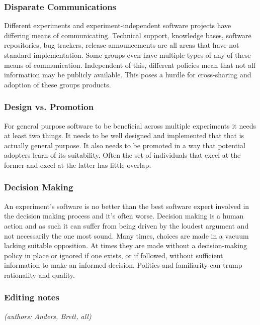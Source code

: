 \subsubsection{Disparate Communications}

Different experiments and experiment-independent software projects
have differing means of communicating.  Technical support, knowledge
bases, software repositories, bug trackers, release announcements are
all areas that have not standard implementation.  Some groups even
have multiple types of any of these means of communication.
Independent of this, different policies mean that not all information
may be publicly available.  This poses a hurdle for cross-sharing and
adoption of these groups products.

\subsubsection{Design vs. Promotion}

For general purpose software to be beneficial across multiple
experiments it needs at least two things.  It needs to be well
designed and implemented that that is actually general purpose.  It
also needs to be promoted in a way that potential adopters learn of
its suitability.  Often the set of individuals that excel at the
former and excel at the latter has little overlap.

\subsubsection{Decision Making}

An experiment's software is no better than the best software expert
involved in the decision making process and it's often worse.
Decision making is a human action and as such it can suffer from being
driven by the loudest argument and not necessarily the one most sound.
Many times, choices are made in a vacuum lacking suitable opposition.
At times they are made without a decision-making policy in place or
ignored if one exists, or if followed, without sufficient information
to make an informed decision.  Politics and familiarity can trump
rationality and quality.


\subsubsection{Editing notes}

\textit{(authors: Anders, Brett, all)}

